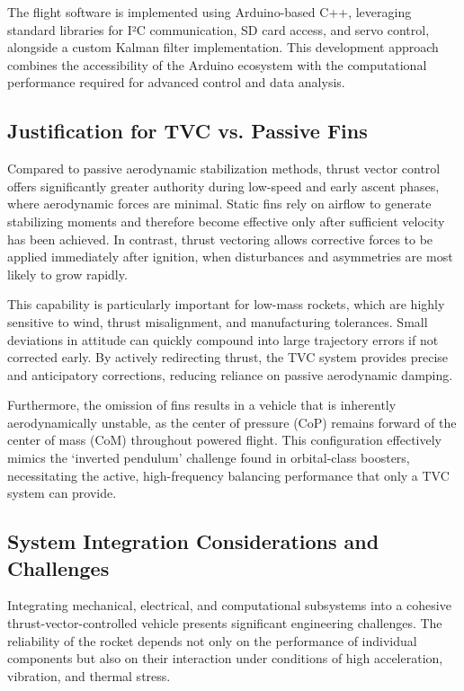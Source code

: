 The flight software is implemented using Arduino-based C++, leveraging standard libraries for I²C communication, SD card access, and servo control, alongside a custom Kalman filter implementation. This development approach combines the accessibility of the Arduino ecosystem with the computational performance required for advanced control and data analysis.


\subsection{Justification for TVC vs. Passive Fins}

Compared to passive aerodynamic stabilization methods, thrust vector control offers significantly greater authority during low-speed and early ascent phases, where aerodynamic forces are minimal. Static fins rely on airflow to generate stabilizing moments and therefore become effective only after sufficient velocity has been achieved. In contrast, thrust vectoring allows corrective forces to be applied immediately after ignition, when disturbances and asymmetries are most likely to grow rapidly.

This capability is particularly important for low-mass rockets, which are highly sensitive to wind, thrust misalignment, and manufacturing tolerances. Small deviations in attitude can quickly compound into large trajectory errors if not corrected early. By actively redirecting thrust, the TVC system provides precise and anticipatory corrections, reducing reliance on passive aerodynamic damping.

Furthermore, the omission of fins results in a vehicle that is inherently aerodynamically unstable, as the center of pressure (CoP) remains forward of the center of mass (CoM) throughout powered flight. This configuration effectively mimics the `inverted pendulum' challenge found in orbital-class boosters, necessitating the active, high-frequency balancing performance that only a TVC system can provide.

\subsection{System Integration Considerations and Challenges}

Integrating mechanical, electrical, and computational subsystems into a cohesive thrust-vector-controlled vehicle presents significant engineering challenges. The reliability of the rocket depends not only on the performance of individual components but also on their interaction under conditions of high acceleration, vibration, and thermal stress.

